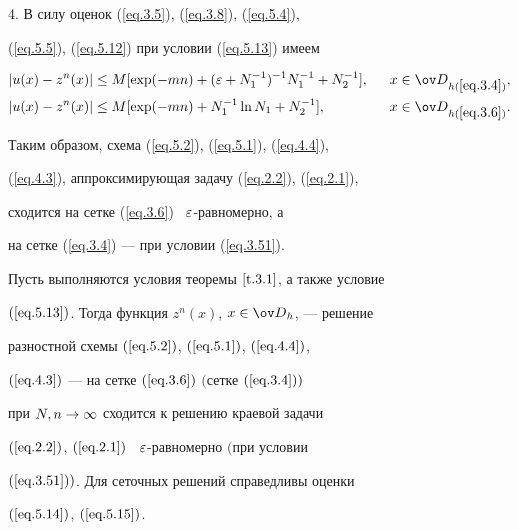 4. В силу оценок (\ref{eq.3.5}), (\ref{eq.3.8}), (\ref{eq.5.4}),


(\ref{eq.5.5}), (\ref{eq.5.12}) при условии (\ref{eq.5.13}) имеем


\begin{alignat}{2} \label{eq.5.14}


|u(x)-z^n(x)|&\leq M [\exp (-m n) +


(\eps+N_1^{-1})^{-1} N_1^{-1} + N_2^{-1}], & \ \


x&\in\od_{h(\ref{eq.3.4})},\\


%


\label{eq.5.15}


|u(x)-z^n(x)|&\leq M [\exp (-m n) + N_1^{-1}\ln N_1


+ N_2^{-1}], & \ \ x&\in\od_{h(\ref{eq.3.6})}.


\end{alignat}


Таким образом, схема (\ref{eq.5.2}), (\ref{eq.5.1}), (\ref{eq.4.4}),


(\ref{eq.4.3}), аппроксимирующая задачу (\ref{eq.2.2}), (\ref{eq.2.1}),


сходится на сетке (\ref{eq.3.6}) \ $\varepsilon$-равномерно, а


на сетке (\ref{eq.3.4}) --- при условии (\ref{eq.3.51}).





\begin{thms} \label{t.5.3}


Пусть выполняются условия теоремы $\ref{t.3.1}$, а также условие


$(\ref{eq.5.13})$. Тогда функция $z^n(x)$, $x\in\od_h$, --- решение


разностной схемы $(\ref{eq.5.2})$, $(\ref{eq.5.1})$, $(\ref{eq.4.4})$,


$(\ref{eq.4.3})$ --- на сетке $(\ref{eq.3.6})$ $($сетке $(\ref{eq.3.4}))$


при $N,n\rightarrow \infty$ сходится к решению краевой задачи


$(\ref{eq.2.2})$, $(\ref{eq.2.1})$ \ $\varepsilon$-равномерно $($при условии


$(\ref{eq.3.51}))$. Для сеточных решений справедливы оценки


$(\ref{eq.5.14})$, $(\ref{eq.5.15})$.


\end{thms}











